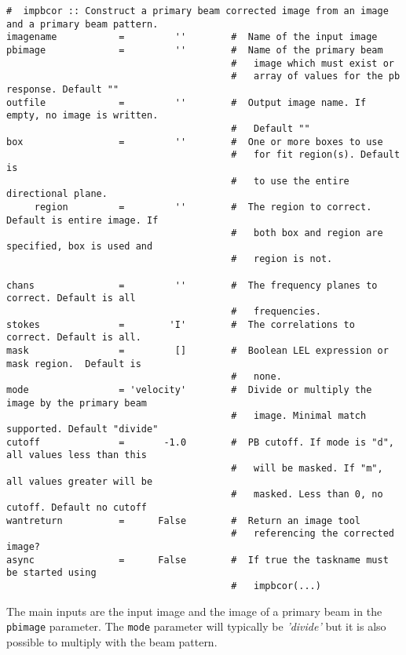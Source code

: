 \small
\begin{verbatim}
#  impbcor :: Construct a primary beam corrected image from an image
and a primary beam pattern.
imagename           =         ''        #  Name of the input image
pbimage             =         ''        #  Name of the primary beam
                                        #   image which must exist or
                                        #   array of values for the pb response. Default ""
outfile             =         ''        #  Output image name. If empty, no image is written.
                                        #   Default ""
box                 =         ''        #  One or more boxes to use
                                        #   for fit region(s). Default is
                                        #   to use the entire directional plane.
     region         =         ''        #  The region to correct. Default is entire image. If
                                        #   both box and region are specified, box is used and
                                        #   region is not.

chans               =         ''        #  The frequency planes to correct. Default is all
                                        #   frequencies.
stokes              =        'I'        #  The correlations to correct. Default is all.
mask                =         []        #  Boolean LEL expression or mask region.  Default is
                                        #   none.
mode                = 'velocity'        #  Divide or multiply the image by the primary beam
                                        #   image. Minimal match supported. Default "divide"
cutoff              =       -1.0        #  PB cutoff. If mode is "d", all values less than this
                                        #   will be masked. If "m", all values greater will be
                                        #   masked. Less than 0, no cutoff. Default no cutoff
wantreturn          =      False        #  Return an image tool
                                        #   referencing the corrected image?
async               =      False        #  If true the taskname must be started using
                                        #   impbcor(...)
\end{verbatim}
\normalsize                             

The main inputs are the input image and the image of a primary beam in
the {\tt pbimage} parameter. The {\tt mode} parameter will typically
be {\it 'divide'} but it is also possible to multiply with the beam
pattern.

